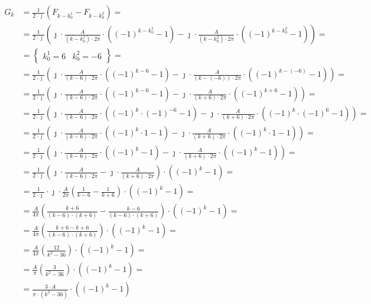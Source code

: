\begin{task}
\begin{align*}
G_k &= \frac{1}{2\cdot \jmath} \left( F_{k-k^1_0} - F_{k-k^2_0} \right) =\\
 &= \frac{1}{2\cdot \jmath} \left( 
\jmath \cdot \frac{A}{\left(k-k^1_0\right)\cdot 2 \pi}\cdot \left( (-1)^{k-k^1_0} -1 \right)
 - \jmath \cdot \frac{A}{\left(k-k^2_0\right)\cdot 2 \pi}\cdot \left( (-1)^{k-k^2_0} -1 \right) \right) = \\
&=\left\{\begin{array}{ll}
k^1_0 = 6 & k^2_0 = -6
\end{array}\right\}=\\ 
&= \frac{1}{2\cdot \jmath} \left( 
\jmath \cdot \frac{A}{\left(k-6\right)\cdot 2 \pi}\cdot \left( (-1)^{k-6} -1 \right)
- \jmath \cdot \frac{A}{\left(k-\left(-6\right)\right)\cdot 2 \pi}\cdot \left( (-1)^{k-\left(-6\right)} -1 \right) \right) =\\
&= \frac{1}{2\cdot \jmath} \left( 
\jmath \cdot \frac{A}{\left(k-6\right)\cdot 2 \pi}\cdot \left( (-1)^{k-6} -1 \right)
- \jmath \cdot \frac{A}{\left(k+6\right)\cdot 2 \pi}\cdot \left( (-1)^{k+6} -1 \right) \right) =\\
&= \frac{1}{2\cdot \jmath} \left( 
\jmath \cdot \frac{A}{\left(k-6\right)\cdot 2 \pi}\cdot \left( (-1)^{k} \cdot (-1)^{-6} -1 \right)
- \jmath \cdot \frac{A}{\left(k+6\right)\cdot 2 \pi}\cdot \left( (-1)^{k} \cdot (-1)^{6} -1 \right) \right) =\\
&= \frac{1}{2\cdot \jmath} \left( 
\jmath \cdot \frac{A}{\left(k-6\right)\cdot 2 \pi}\cdot \left( (-1)^{k} \cdot 1 -1 \right)
- \jmath \cdot \frac{A}{\left(k+6\right)\cdot 2 \pi}\cdot \left( (-1)^{k} \cdot 1 -1 \right) \right) =\\
&= \frac{1}{2\cdot \jmath} \left( 
\jmath \cdot \frac{A}{\left(k-6\right)\cdot 2 \pi}\cdot \left( (-1)^{k} -1 \right)
- \jmath \cdot \frac{A}{\left(k+6\right)\cdot 2 \pi}\cdot \left( (-1)^{k} -1 \right) \right) =\\
&= \frac{1}{2\cdot \jmath} \left( 
\jmath \cdot \frac{A}{\left(k-6\right)\cdot 2 \pi}
- \jmath \cdot \frac{A}{\left(k+6\right)\cdot 2 \pi}\right) \cdot \left( (-1)^{k} -1 \right) =\\
&= \frac{1}{2\cdot \jmath} \cdot \jmath \cdot \frac{A}{2\pi}\left( 
\frac{1}{k-6}
- \frac{1}{k+6}\right) \cdot \left( (-1)^{k} -1 \right) =\\
&= \frac{A}{4\pi}\left( \frac{k+6}{\left(k-6\right)\cdot \left(k+6\right)} - \frac{k-6}{\left(k-6\right)\cdot \left(k+6\right)}\right) \cdot \left( (-1)^{k} -1 \right) =\\
&= \frac{A}{4\pi}\left( \frac{k+6 - k +6}{\left(k-6\right)\cdot \left(k+6\right)} \right) \cdot \left( (-1)^{k} -1 \right) =\\
&= \frac{A}{4\pi}\left( \frac{12}{k^2-36} \right) \cdot \left( (-1)^{k} -1 \right) =\\
&= \frac{A}{\pi}\left( \frac{3}{k^2-36} \right) \cdot \left( (-1)^{k} -1 \right) =\\
&= \frac{3 \cdot A}{\pi \cdot \left( k^2-36 \right)} \cdot \left( (-1)^{k} -1 \right)
\end{align*}


\end{task}
